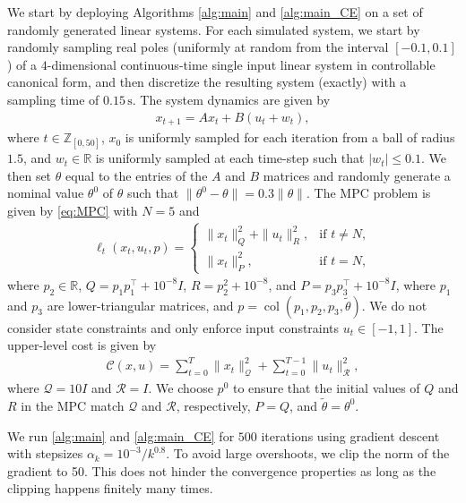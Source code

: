 \documentclass[journal,twoside,web,final]{ieeecolor}
\theoremstyle{definition}
\newcommand{\R}{\mathbb{R}}
\newcommand{\Z}{\mathbb{Z}}
\begin{document}
We start by deploying Algorithms \ref{alg:main} and \ref{alg:main_CE} on a set of randomly generated linear systems.
For each simulated system, we start by randomly sampling real poles 
(uniformly at random from the interval $[-0.1,0.1]$) 
of a $4$-dimensional continuous-time single input linear system in controllable canonical form, 
and then discretize the resulting system (exactly) with a sampling time of $0.15\,\text{s}$. 
The system dynamics are given by
\begin{align*}
x_{t+1} = A x_t + B(u_t + w_t),
\end{align*}
where $t\in\Z_{[0,50]}$, $x_0$ is uniformly sampled for each iteration from a ball of radius $1.5$,
and $w_t\in\R$ is uniformly sampled at each time-step such that $|w_t| \leq 0.1$.
We then set $\theta$ equal to the entries of the $A$ and $B$ matrices and randomly generate a nominal value $\theta^0$ of $\theta$ such that $\|\theta^0-\theta\|=0.3 \|\theta\|$.
The MPC problem is given by \cref{eq:MPC} with $N=5$ and
\begin{align*}
\ell_t(x_t,u_t,p) =
\begin{cases}
\|x_t\|_Q^2 + \|u_t\|_R^2, & \text{if } t \neq N,\\
\|x_t\|_P^2, & \text{if } t = N,
\end{cases}
\end{align*}
where $p_2\in\R$, $Q=p_1p_1^\top+10^{-8}I$, $R=p_2^2+10^{-8}$, and $P=p_3p_3^\top+10^{-8}I$, where $p_1$ and $p_3$ are lower-triangular matrices, and $p=\operatorname*{col}(p_1,p_2,p_3,\tilde{\theta})$. We do not consider state constraints and only enforce input constraints  $u_t\in[-1,1]$.
The upper-level cost is given by
\begin{align*}
\mathcal{C}(x,u) = \sum_{t=0}^{T} \|x_t\|^2_{\mathcal{Q}} + \sum_{t=0}^{T-1} \|u_t\|^2_{\mathcal{R}},
\end{align*}
where $\mathcal{Q}=10 I$ and $\mathcal{R}=I$.
We choose $p^0$ to ensure that the initial values of $Q$ and $R$ in the MPC match $\mathcal{Q}$ and $\mathcal{R}$, respectively, $P=Q$, and $\tilde{\theta}=\theta^0$.

We run \cref{alg:main} and \cref{alg:main_CE} for $500$ iterations using gradient descent with stepsizes $\alpha_k = 10^{-3} / k^{0.8}$.
To avoid large overshoots, we clip the norm of the gradient to 50.
This does not hinder the convergence properties as long as the clipping happens finitely many times.
\end{document}
